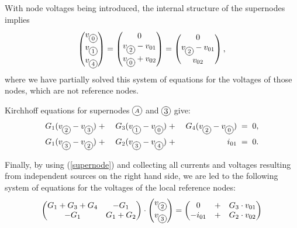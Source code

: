 \documentclass[10pt,journal,twocolumn,pagenumbers]{IEEEtran}
\begin{document}
With node voltages being introduced, the internal struct\-ure of the supernodes implies
\begin{equation}
\label{supernode}
\begin{pmatrix}
v_{\xy*+{\scriptstyle{0}}*\cir{}\endxy}\\
v_{\xy*+{\scriptstyle{1}}*\cir{}\endxy}\\
v_{\xy*+{\scriptstyle{4}}*\cir{}\endxy}
\end{pmatrix}
=
\begin{pmatrix}
0\\
v_{\xy*+{\scriptstyle{2}}*\cir{}\endxy} - v_{01}\\
v_{\xy*+{\scriptstyle{0}}*\cir{}\endxy} + v_{02}\\
\end{pmatrix}
=
\begin{pmatrix}
0\\
v_{\xy*+{\scriptstyle{2}}*\cir{}\endxy} - v_{01}\\
v_{02}
\end{pmatrix},
\end{equation}
where we have partially solved this system of equations for the voltages of those nodes, which are not reference nodes.

Kirchhoff equations for supernodes ${\xy*+{\scriptstyle{A}}*\cir{}\endxy}$ and ${\xy*+{3}*\cir{}\endxy}$ give:
\begin{alignat*}{5}
G_1(v_{\xy*+{\scriptstyle{2}}*\cir{}\endxy}-v_{\xy*+{\scriptstyle{3}}*\cir{}\endxy}) &\; +\; & 
G_3(v_{\xy*+{\scriptstyle{1}}*\cir{}\endxy}-v_{\xy*+{\scriptstyle{0}}*\cir{}\endxy}) &\; +\; &
G_4(v_{\xy*+{\scriptstyle{2}}*\cir{}\endxy}-v_{\xy*+{\scriptstyle{0}}*\cir{}\endxy}) 
&\; =\; 0,\\
G_1(v_{\xy*+{\scriptstyle{3}}*\cir{}\endxy}-v_{\xy*+{\scriptstyle{2}}*\cir{}\endxy}) &\; +\; & 
G_2(v_{\xy*+{\scriptstyle{3}}*\cir{}\endxy}-v_{\xy*+{\scriptstyle{4}}*\cir{}\endxy}) &\; +\; &
\quad\quad i_{01}
&\; =\; 0.
\end{alignat*}

Finally, by using (\ref{supernode}) and collecting all currents and voltages resulting from independent sources on the right hand side, we are led to the following system of equations for the voltages of the local reference nodes: 
\begin{equation}
\label{exfinal}
\begin{pmatrix}
G_1+G_3+G_4 & - G_1 \\
- G_1 & G_1+G_2\\
\end{pmatrix}
\cdot
\begin{pmatrix}
v_{\xy*+{\scriptstyle{2}}*\cir{}\endxy}\\
v_{\xy*+{\scriptstyle{3}}*\cir{}\endxy}\\
\end{pmatrix}
=
\begin{pmatrix}
0 &+& G_3\cdot v_{01}\\
-i_{01} &+& G_2\cdot v_{02}\\
\end{pmatrix}
\end{equation}
\end{document}
